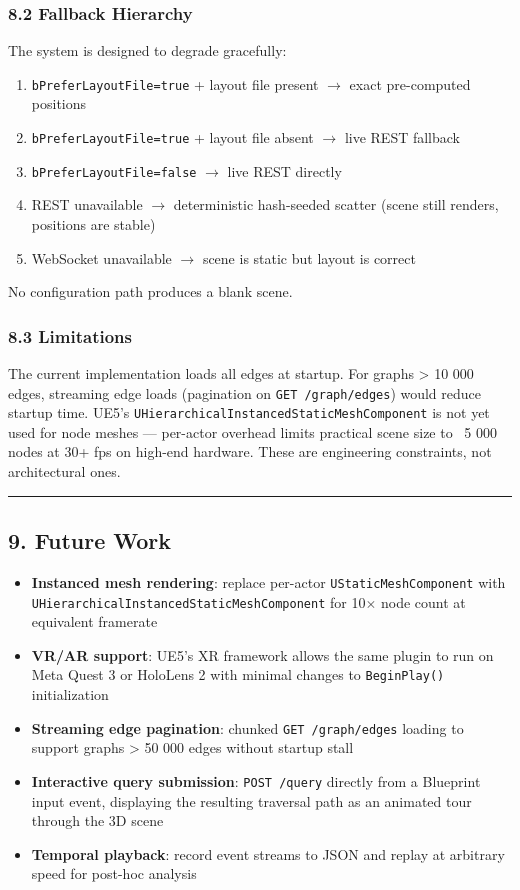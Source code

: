 \subsubsection*{8.2 Fallback Hierarchy}

The system is designed to degrade gracefully:
\begin{enumerate}
  \item \texttt{bPreferLayoutFile=true} + layout file present $\to$ exact pre-computed positions
  \item \texttt{bPreferLayoutFile=true} + layout file absent $\to$ live REST fallback
  \item \texttt{bPreferLayoutFile=false} $\to$ live REST directly
  \item REST unavailable $\to$ deterministic hash-seeded scatter (scene still renders, positions are stable)
  \item WebSocket unavailable $\to$ scene is static but layout is correct
\end{enumerate}


No configuration path produces a blank scene.

\subsubsection*{8.3 Limitations}

The current implementation loads all edges at startup. For graphs > 10 000 edges, streaming edge loads (pagination on \texttt{GET /graph/edges}) would reduce startup time. UE5's \texttt{UHierarchicalInstancedStaticMeshComponent} is not yet used for node meshes --- per-actor overhead limits practical scene size to ~5 000 nodes at 30+ fps on high-end hardware. These are engineering constraints, not architectural ones.

\medskip\noindent\rule{\linewidth}{0.4pt}\medskip

\subsection*{9. Future Work}

\begin{itemize}
  \item \textbf{Instanced mesh rendering}: replace per-actor \texttt{UStaticMeshComponent} with \texttt{UHierarchicalInstancedStaticMeshComponent} for 10$\times$ node count at equivalent framerate
  \item \textbf{VR/AR support}: UE5's XR framework allows the same plugin to run on Meta Quest 3 or HoloLens 2 with minimal changes to \texttt{BeginPlay()} initialization
  \item \textbf{Streaming edge pagination}: chunked \texttt{GET /graph/edges} loading to support graphs > 50 000 edges without startup stall
  \item \textbf{Interactive query submission}: \texttt{POST /query} directly from a Blueprint input event, displaying the resulting traversal path as an animated tour through the 3D scene
  \item \textbf{Temporal playback}: record event streams to JSON and replay at arbitrary speed for post-hoc analysis
\end{itemize}



